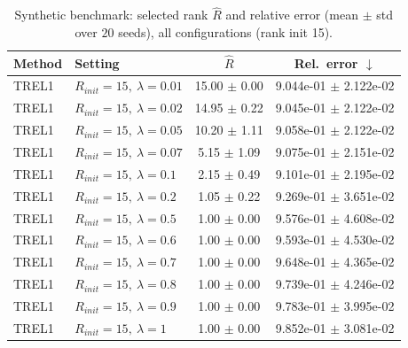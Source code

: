 \begin{table}[t]
\centering
\caption{Synthetic benchmark: selected rank \(\hat R\) and relative error (mean \(\pm\) std over \(20\) seeds), all configurations (rank init 15).}
\label{tab:results_synth_all}
\begin{tabular}{@{}llcc@{}}
\toprule
Method & Setting & \(\hat R\) & Rel.\ error \(\downarrow\) \\ \midrule
TREL1 & \(R_{init}=15,\ \lambda=0.01\) & 15.00 $\pm$ 0.00 & 9.044e-01 $\pm$ 2.122e-02 \\
TREL1 & \(R_{init}=15,\ \lambda=0.02\) & 14.95 $\pm$ 0.22 & 9.045e-01 $\pm$ 2.122e-02 \\
TREL1 & \(R_{init}=15,\ \lambda=0.05\) & 10.20 $\pm$ 1.11 & 9.058e-01 $\pm$ 2.122e-02 \\
TREL1 & \(R_{init}=15,\ \lambda=0.07\) & 5.15 $\pm$ 1.09 & 9.075e-01 $\pm$ 2.151e-02 \\
TREL1 & \(R_{init}=15,\ \lambda=0.1\) & 2.15 $\pm$ 0.49 & 9.101e-01 $\pm$ 2.195e-02 \\
TREL1 & \(R_{init}=15,\ \lambda=0.2\) & 1.05 $\pm$ 0.22 & 9.269e-01 $\pm$ 3.651e-02 \\
TREL1 & \(R_{init}=15,\ \lambda=0.5\) & 1.00 $\pm$ 0.00 & 9.576e-01 $\pm$ 4.608e-02 \\
TREL1 & \(R_{init}=15,\ \lambda=0.6\) & 1.00 $\pm$ 0.00 & 9.593e-01 $\pm$ 4.530e-02 \\
TREL1 & \(R_{init}=15,\ \lambda=0.7\) & 1.00 $\pm$ 0.00 & 9.648e-01 $\pm$ 4.365e-02 \\
TREL1 & \(R_{init}=15,\ \lambda=0.8\) & 1.00 $\pm$ 0.00 & 9.739e-01 $\pm$ 4.246e-02 \\
TREL1 & \(R_{init}=15,\ \lambda=0.9\) & 1.00 $\pm$ 0.00 & 9.783e-01 $\pm$ 3.995e-02 \\
TREL1 & \(R_{init}=15,\ \lambda=1\) & 1.00 $\pm$ 0.00 & 9.852e-01 $\pm$ 3.081e-02 \\
\bottomrule
\end{tabular}
\end{table}